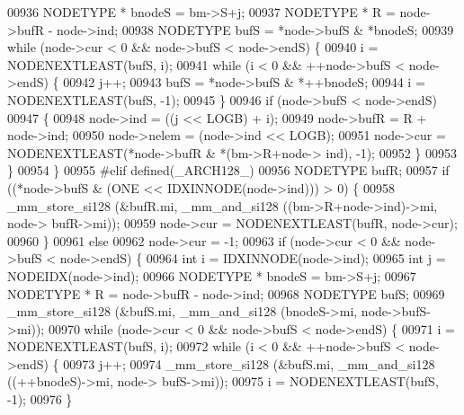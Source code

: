 \begin{DoxyCode}
00936                 NODETYPE * bnodeS = bm->S+j;
00937                 NODETYPE * R = node->bufR - node->ind;
00938                 NODETYPE bufS = *node->bufS & *bnodeS;
00939                 \textcolor{keywordflow}{while} (node->cur < 0 && node->bufS < node->endS) \{
00940                         i = NODENEXTLEAST(bufS, i);
00941                         \textcolor{keywordflow}{while} (i < 0 && ++node->bufS < node->endS) \{
00942                                 j++;
00943                                 bufS = *node->bufS & *++bnodeS;
00944                                 i = NODENEXTLEAST(bufS, -1);
00945                         \}
00946                         \textcolor{keywordflow}{if} (node->bufS < node->endS)
00947                         \{
00948                                 node->ind = ((j << LOGB) + i);
00949                                 node->bufR = R + node->ind;
00950                                 node->nelem = (node->ind << LOGB);
00951                                 node->cur = NODENEXTLEAST(*node->bufR & *(bm->R+node->
      ind), -1);
00952                         \}
00953                 \}
00954         \}
00955 \textcolor{preprocessor}{#elif defined(\_ARCH128\_)}
00956         NODETYPE bufR;
00957         \textcolor{keywordflow}{if} ((*node->bufS & (ONE << IDXINNODE(node->ind))) > 0) \{
00958                 \_mm\_store\_si128 (&bufR.mi, \_mm\_and\_si128 ((bm->R+node->ind)->mi, node->
      bufR->mi));
00959                 node->cur = NODENEXTLEAST(bufR, node->cur);
00960         \}
00961         \textcolor{keywordflow}{else}
00962                 node->cur = -1;
00963         \textcolor{keywordflow}{if} (node->cur < 0 && node->bufS < node->endS) \{
00964                 \textcolor{keywordtype}{int} i = IDXINNODE(node->ind);
00965                 \textcolor{keywordtype}{int} j = NODEIDX(node->ind);
00966                 NODETYPE * bnodeS = bm->S+j;
00967                 NODETYPE * R = node->bufR - node->ind;
00968                 NODETYPE bufS;
00969             \_mm\_store\_si128 (&bufS.mi, \_mm\_and\_si128 (bnodeS->mi, node->bufS->mi));
00970                 \textcolor{keywordflow}{while} (node->cur < 0 && node->bufS < node->endS) \{
00971                         i = NODENEXTLEAST(bufS, i);
00972                         \textcolor{keywordflow}{while} (i < 0 && ++node->bufS < node->endS) \{
00973                                 j++;
00974                             \_mm\_store\_si128 (&bufS.mi, \_mm\_and\_si128 ((++bnodeS)->mi, node->
      bufS->mi));
00975                                 i = NODENEXTLEAST(bufS, -1);
00976                         \}

\end{DoxyCode}

